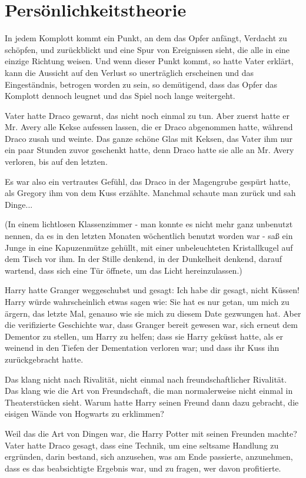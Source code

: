 \chapter{Persönlichkeitstheorie}

In jedem Komplott kommt ein Punkt, an dem das Opfer anfängt, Verdacht zu
schöpfen, und zurückblickt und eine Spur von Ereignissen sieht, die alle in eine
einzige Richtung weisen. Und wenn dieser Punkt kommt, so hatte Vater erklärt,
kann die Aussicht auf den Verlust so unerträglich erscheinen und das
Eingeständnis, betrogen worden zu sein, so demütigend, dass das Opfer das
Komplott dennoch leugnet und das Spiel noch lange weitergeht.

Vater hatte Draco gewarnt, das nicht noch einmal zu tun. Aber zuerst hatte er
Mr. Avery alle Kekse aufessen lassen, die er Draco abgenommen hatte, während
Draco zusah und weinte. Das ganze schöne Glas mit Keksen, das Vater ihm nur ein
paar Stunden zuvor geschenkt hatte, denn Draco hatte sie alle an Mr. Avery
verloren, bis auf den letzten.

Es war also ein vertrautes Gefühl, das Draco in der Magengrube gespürt hatte,
als Gregory ihm von dem Kuss erzählte. Manchmal schaute man zurück und sah
Dinge...

(In einem lichtlosen Klassenzimmer - man konnte es nicht mehr ganz unbenutzt
nennen, da es in den letzten Monaten wöchentlich benutzt worden war - saß ein
Junge in eine Kapuzenmütze gehüllt, mit einer unbeleuchteten Kristallkugel auf
dem Tisch vor ihm. In der Stille denkend, in der Dunkelheit denkend, darauf
wartend, dass sich eine Tür öffnete, um das Licht hereinzulassen.)

Harry hatte Granger weggeschubst und gesagt: Ich habe dir gesagt, nicht Küssen!
Harry würde wahrscheinlich etwas sagen wie: Sie hat es nur getan, um mich zu
ärgern, das letzte Mal, genauso wie sie mich zu diesem Date gezwungen hat. Aber
die verifizierte Geschichte war, dass Granger bereit gewesen war, sich erneut
dem Dementor zu stellen, um Harry zu helfen; dass sie Harry geküsst hatte, als
er weinend in den Tiefen der Dementation verloren war; und dass ihr Kuss ihn
zurückgebracht hatte.

Das klang nicht nach Rivalität, nicht einmal nach freundschaftlicher Rivalität.
Das klang wie die Art von Freundschaft, die man normalerweise nicht einmal in
Theaterstücken sieht. Warum hatte Harry seinen Freund dann dazu gebracht, die
eisigen Wände von Hogwarts zu erklimmen?

Weil das die Art von Dingen war, die Harry Potter mit seinen Freunden machte?
Vater hatte Draco gesagt, dass eine Technik, um eine seltsame Handlung zu
ergründen, darin bestand, sich anzusehen, was am Ende passierte, anzunehmen,
dass es das beabsichtigte Ergebnis war, und zu fragen, wer davon profitierte.

